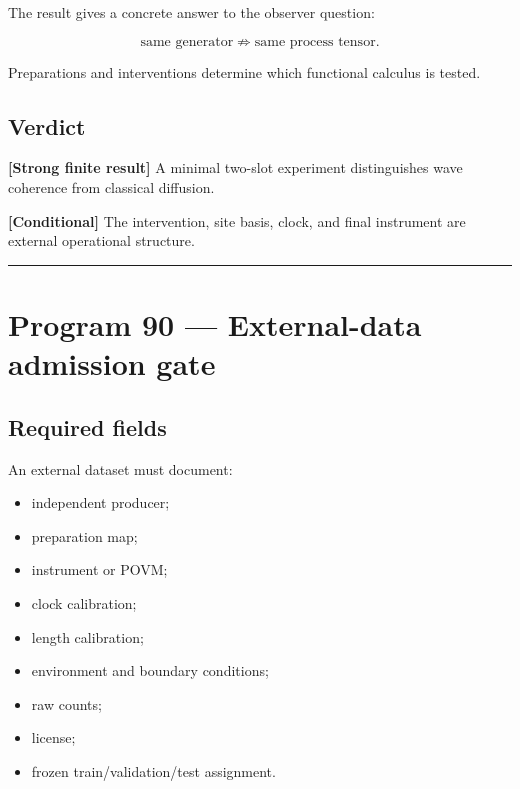 \documentclass[11pt,a4paper,openany]{report}
\newcommand{\statusConditional}{\textcolor{finorange}{[Conditional]}}
\begin{document}
The result gives a concrete answer to the observer question:

\[
\text{same generator}
\not\Longrightarrow
\text{same process tensor}.
\]

Preparations and interventions determine which functional calculus is tested.

\section{Verdict}

\textbf{[Strong finite result]} A minimal two-slot experiment distinguishes wave coherence from classical diffusion.

\textbf{\statusConditional{}} The intervention, site basis, clock, and final instrument are external operational structure.

\par\medskip\hrule\medskip

\chapter{Program 90 --- External-data admission gate}

\section{Required fields}

An external dataset must document:

\begin{itemize}
\item 
independent producer;

\item 
preparation map;

\item 
instrument or POVM;

\item 
clock calibration;

\item 
length calibration;

\item 
environment and boundary conditions;

\item 
raw counts;

\item 
license;

\item 
frozen train/\allowbreak{}validation/\allowbreak{}test assignment.

\end{itemize}
\end{document}
